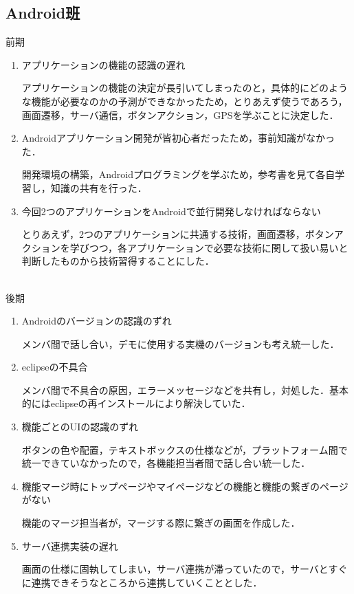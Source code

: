 \subsection{Android班}
前期
\\
\begin{enumerate}
\item アプリケーションの機能の認識の遅れ
\par
アプリケーションの機能の決定が長引いてしまったのと，具体的にどのような機能が必要なのかの予測ができなかったため，とりあえず使うであろう，画面遷移，サーバ通信，ボタンアクション，GPSを学ぶことに決定した．
\item Androidアプリケーション開発が皆初心者だったため，事前知識がなかった．
\par
開発環境の構築，Androidプログラミングを学ぶため，参考書を見て各自学習し，知識の共有を行った．
\item 今回2つのアプリケーションをAndroidで並行開発しなければならない
\par
とりあえず，2つのアプリケーションに共通する技術，画面遷移，ボタンアクションを学びつつ，各アプリケーションで必要な技術に関して扱い易いと判断したものから技術習得することにした．
\end{enumerate}
\\
後期
\\
\begin{enumerate}
\item Androidのバージョンの認識のずれ
\par
メンバ間で話し合い，デモに使用する実機のバージョンも考え統一した．
\item eclipseの不具合
\par
メンバ間で不具合の原因，エラーメッセージなどを共有し，対処した．基本的にはeclipseの再インストールにより解決していた．
\item 機能ごとのUIの認識のずれ
\par
ボタンの色や配置，テキストボックスの仕様などが，プラットフォーム間で統一できていなかったので，各機能担当者間で話し合い統一した．
\item 機能マージ時にトップページやマイページなどの機能と機能の繋ぎのページがない
\par
機能のマージ担当者が，マージする際に繋ぎの画面を作成した．
\item サーバ連携実装の遅れ
\par
画面の仕様に固執してしまい，サーバ連携が滞っていたので，サーバとすぐに連携できそうなところから連携していくこととした．
\end{enumerate}
